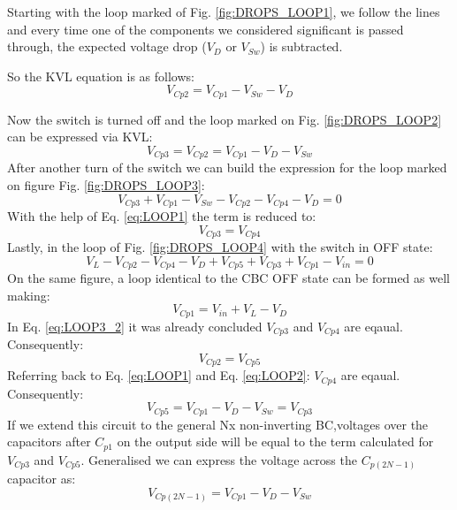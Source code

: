 Starting with the loop marked of Fig. \ref{fig:DROPS_LOOP1}, we follow the lines and every time one of the components we considered significant is passed through, the expected voltage drop ($V_D$ or $V_{Sw}$) is subtracted.

So the KVL equation is as follows: 
\begin{equation}
	V_{Cp2} = V_{Cp1}-V_{Sw}-V_D
	\label{eq:LOOP1}
\end{equation}

Now the switch is turned off and the loop marked on Fig. \ref{fig:DROPS_LOOP2} can be expressed via KVL: 
\begin{equation}
	V_{Cp3} = V_{Cp2}=V_{Cp1}-V_D-V_{Sw}
	\label{eq:LOOP2}
\end{equation}
After another turn of the switch we can build the expression for the loop marked on figure Fig. \ref{fig:DROPS_LOOP3}:
\begin{equation}
	V_{Cp3}+V_{Cp1}-V_{Sw}-V_{Cp2}-V_{Cp4}-V_D=0
	\label{eq:LOOP3_1}
\end{equation}
With the help of Eq. \ref{eq:LOOP1} the term is reduced to:
\begin{equation}
	V_{Cp3} = V_{Cp4}
	\label{eq:LOOP3_2}
\end{equation}
Lastly, in the loop of Fig. \ref{fig:DROPS_LOOP4} with the switch in OFF state:
\begin{equation}
	V_L-V_{Cp2}-V_{Cp4}-V_D+V_{Cp5}+V_{Cp3}+V_{Cp1}-V_{in}= 0
	\label{eq:LOOP4_1}
\end{equation}
On the same figure, a loop identical to the CBC OFF state can be formed as well making:
\begin{equation}
	V_{Cp1}=V_{in}+V_L-V_D
	\label{eq:LOOP4_2}
\end{equation}
In Eq. \ref{eq:LOOP3_2} it was already concluded $V_{Cp3}$ and $V_{Cp4}$ are eqaual. Consequently: 
\begin{equation}
	V_{Cp2} = V_{Cp5}
	\label{eq:LOOP4_3}
\end{equation}
Referring back to Eq. \ref{eq:LOOP1} and Eq. \ref{eq:LOOP2}: 
$V_{Cp4}$ are eqaual. Consequently: 
\begin{equation}
	V_{Cp5}=V_{Cp1}-V_D-V_{Sw} =V_{Cp3} 
	\label{eq:LOOP4_4}
\end{equation}
If we extend this circuit to the general Nx non-inverting BC,voltages over the capacitors after $C_{p1}$ on the output side will be equal to the term calculated for $V_{Cp3}$ and  $V_{Cp5}$. Generalised we can express the voltage across the $C_{p(2N-1)}$ capacitor as: 
\begin{equation}
	V_{Cp(2N-1)}= V_{Cp1}-V_D-V_{Sw} 
	\label{eq:C_2N-1}
\end{equation}

